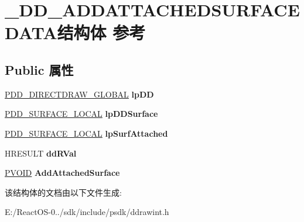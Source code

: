 \hypertarget{struct___d_d___a_d_d_a_t_t_a_c_h_e_d_s_u_r_f_a_c_e_d_a_t_a}{}\section{\+\_\+\+D\+D\+\_\+\+A\+D\+D\+A\+T\+T\+A\+C\+H\+E\+D\+S\+U\+R\+F\+A\+C\+E\+D\+A\+T\+A结构体 参考}
\label{struct___d_d___a_d_d_a_t_t_a_c_h_e_d_s_u_r_f_a_c_e_d_a_t_a}
\subsection*{Public 属性}
\begin{DoxyCompactItemize}
\item 
\mbox{\label{struct___d_d___a_d_d_a_t_t_a_c_h_e_d_s_u_r_f_a_c_e_d_a_t_a_a33da57d8da7c7e4c5093746dc2a525b1}} 
\hyperlink{struct___d_d___d_i_r_e_c_t_d_r_a_w___g_l_o_b_a_l}{P\+D\+D\+\_\+\+D\+I\+R\+E\+C\+T\+D\+R\+A\+W\+\_\+\+G\+L\+O\+B\+AL} {\bfseries lp\+DD}
\item 
\mbox{\label{struct___d_d___a_d_d_a_t_t_a_c_h_e_d_s_u_r_f_a_c_e_d_a_t_a_a93b526b8eced69339ec74796ae7e25ff}} 
\hyperlink{struct___d_d___s_u_r_f_a_c_e___l_o_c_a_l}{P\+D\+D\+\_\+\+S\+U\+R\+F\+A\+C\+E\+\_\+\+L\+O\+C\+AL} {\bfseries lp\+D\+D\+Surface}
\item 
\mbox{\label{struct___d_d___a_d_d_a_t_t_a_c_h_e_d_s_u_r_f_a_c_e_d_a_t_a_a0e1e70641575681dda4c4bef9248e958}} 
\hyperlink{struct___d_d___s_u_r_f_a_c_e___l_o_c_a_l}{P\+D\+D\+\_\+\+S\+U\+R\+F\+A\+C\+E\+\_\+\+L\+O\+C\+AL} {\bfseries lp\+Surf\+Attached}
\item 
\mbox{\label{struct___d_d___a_d_d_a_t_t_a_c_h_e_d_s_u_r_f_a_c_e_d_a_t_a_ad53608cc71fe4c18fafcd1b8db1945a7}} 
H\+R\+E\+S\+U\+LT {\bfseries dd\+R\+Val}
\item 
\mbox{\label{struct___d_d___a_d_d_a_t_t_a_c_h_e_d_s_u_r_f_a_c_e_d_a_t_a_ac4a4a240317c91479f6e800b0b2af52b}} 
\hyperlink{interfacevoid}{P\+V\+O\+ID} {\bfseries Add\+Attached\+Surface}
\end{DoxyCompactItemize}


该结构体的文档由以下文件生成\+:\begin{DoxyCompactItemize}
\item 
E\+:/\+React\+O\+S-\/0../sdk/include/psdk/ddrawint.\+h\end{DoxyCompactItemize}
